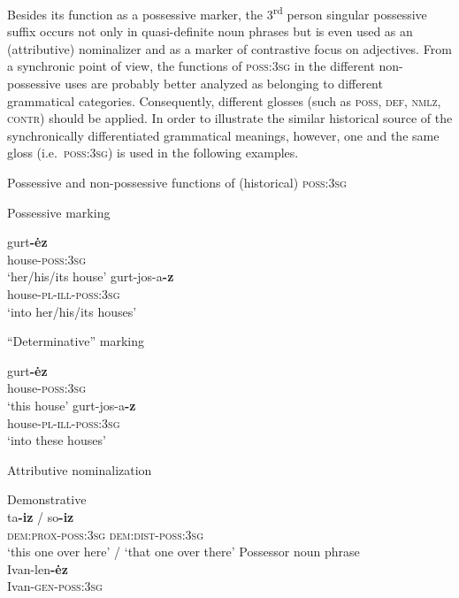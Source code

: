 Besides its function as a possessive marker, the 3\textsuperscript{rd} person singular possessive suffix occurs not only in quasi-definite noun phrases but is even used as an (attributive) nominalizer and as a marker of contrastive focus on adjectives. From a synchronic point of view, the functions of \textsc{poss:3sg} in the different non-possessive uses are probably better analyzed as belonging to different grammatical categories. Consequently, different glosses (such as \textsc{poss, def, nmlz, contr}) should be applied. In order to illustrate the similar historical source of the synchronically differentiated grammatical meanings, however, one and the same gloss (i.e.~\textsc{poss:3sg}) is used in the following examples.
\begin{exe}
\ex \rm{Possessive and non-possessive functions of (historical) \textsc{poss:3sg}}
\begin{xlist}
\ex \rm{Possessive marking} \label{udmurt possmarking}
\begin{xlist}
\ex	
\gll	gurt\textbf{-ėz}\\
	house-\textsc{poss:3sg}\\
\glt	‘her/his/its house’
\ex	
\gll	gurt-jos-a\textbf{-z}\\
	house-\textsc{pl}-\textsc{ill}-\textsc{poss:3sg}\\
\glt	‘into her/his/its houses’
\end{xlist}
\ex \rm{“Determinative” marking}
\begin{xlist}
\ex	
\gll	gurt\textbf{-ėz}\\
	house-\textsc{poss:3sg}\\
\glt	‘this house’
\ex	
\gll	gurt-jos-a\textbf{-z}\\
	house-\textsc{pl}-\textsc{ill}-\textsc{poss:3sg}\\
\glt	‘into these houses’
\end{xlist}
\ex	\rm{Attributive nominalization} \label{udmurt diachr nomzr}
\begin{xlist}
\ex \rm{Demonstrative}\\ \label{udmurt diachr dem-nomzr}
\gll	ta\textbf{-iz} / so\textbf{-iz}\\
 	\textsc{dem:prox}-\textsc{poss:3sg} {} \textsc{dem:dist}-\textsc{poss:3sg}\\
\glt	‘this one over here’ / ‘that one over there’
\ex 	\rm{Possessor noun phrase}\\ \label{udmurt diachr gen-nomzr}
\gll	Ivan-len\textbf{-ėz}\\
	Ivan-\textsc{gen}-\textsc{poss:3sg}\\

\end{xlist}
\end{xlist}
\end{exe}
